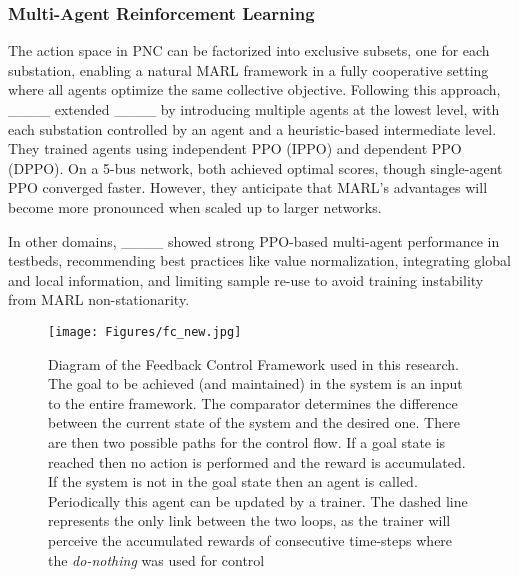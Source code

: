 \subsubsection{Multi-Agent Reinforcement Learning}
The action space in PNC can be factorized into exclusive subsets, one for each substation, enabling a natural MARL framework in a fully cooperative setting where all agents optimize the same collective objective. Following this approach, ____ extended ____ by introducing multiple agents at the lowest level, with each substation controlled by an agent and a heuristic-based intermediate level. They trained agents using independent PPO (IPPO) and dependent PPO (DPPO). On a 5-bus network, both achieved optimal scores, though single-agent PPO converged faster. However, they anticipate that MARL's advantages will become more pronounced when scaled up to larger networks.

In other domains, ____ showed strong PPO-based multi-agent performance in testbeds, recommending best practices like value normalization, integrating global and local information, 
and limiting sample re-use to avoid training instability from MARL non-stationarity.



\begin{figure*}[th!]
    \centering
    \texttt{[image: Figures/fc\_new.jpg]}
    \caption{Diagram of the Feedback Control Framework used in this research. The goal to be achieved (and maintained) in the system is an input to the entire framework. The comparator determines the difference between the current state of the system and the desired one. There are then two possible paths for the control flow. If a goal state is reached then no action is performed and the reward is accumulated. If the system is not in the goal state then an agent is called. Periodically this agent can be updated by a trainer. The dashed line represents the only link between the two loops, as the trainer will perceive the accumulated rewards of consecutive time-steps where the {\it do-nothing} was used for control}
    \label{fig:feedback-control}
\end{figure*}

